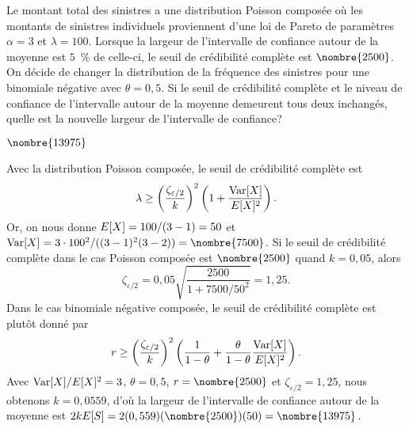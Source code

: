 \begin{exercice}
  Le montant total des sinistres a une distribution Poisson composée
  où les montants de sinistres individuels proviennent d'une loi de
  Pareto de paramètres $\alpha = 3$ et $\lambda = 100$. Lorsque la
  largeur de l'intervalle de confiance autour de la moyenne est $5$~\%
  de celle-ci, le seuil de crédibilité complète est $\nombre{2500}$. On
  décide de changer la distribution de la fréquence des sinistres pour
  une binomiale négative avec $\theta = 0,5$. Si le seuil de
  crédibilité complète et le niveau de confiance de l'intervalle
  autour de la moyenne demeurent tous deux inchangés, quelle est la
  nouvelle largeur de l'intervalle de confiance?
  \begin{rep}
    $\nombre{13975}$
  \end{rep}
  \begin{sol}
    Avec la distribution Poisson composée, le seuil de crédibilité
    complète est
    \begin{equation*}
      \lambda \geq
      \left( \frac{\zeta_{\varepsilon/2}}{k} \right)^2
      \left( 1 + \frac{\operatorname{Var} [ X ]}{E [ X ]^2} \right).
    \end{equation*}
    Or, on nous donne $E [ X ] = 100/(3 - 1) = 50$ et $\var{X} = 3
    \cdot 100^2/((3 - 1)^2 (3 - 2)) = \nombre{7500}$. Si le seuil de
    crédibilité complète dans le cas Poisson composée est
    $\nombre{2500}$ quand $k = 0,05$, alors
    \begin{equation*}
      \zeta_{\varepsilon/2}
      = 0,05 \sqrt{\frac{2500}{1 + 7500/50^2}}
      = 1,25.
    \end{equation*}
    Dans le cas binomiale négative composée, le seuil de crédibilité
    complète est plutôt donné par
    \begin{equation*}
      r \geq
      \left(
        \frac{\zeta_{\varepsilon/2}}{k}
      \right)^2
      \left(
        \frac{1}{1 - \theta} +
        \frac{\theta}{1-\theta} \frac{\operatorname{Var} [ X ]}{E [ X ]^2}
      \right).
    \end{equation*}
    Avec $\operatorname{Var} [ X ]/E [ X ]^2 = 3$, $\theta = 0,5$, $r = \nombre{2500}$
    et $\zeta_{\varepsilon/2} = 1,25$, nous obtenons $k = 0,0559$, d'où la
    largeur de l'intervalle de confiance autour de la moyenne est $2 k
    \esp{S} = 2 (0,559) (\nombre{2500}) (50) = \nombre{13975}$.
  \end{sol}
\end{exercice}

